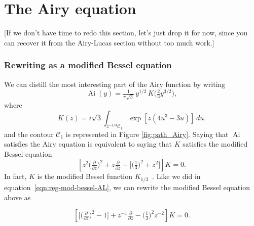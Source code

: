 \documentclass{article}
\DeclareMathOperator{\Ai}{Ai}
\theoremstyle{definition}
\theoremstyle{plain}
\newenvironment{todo}{\color{Coral}}{\color{black}}
\newenvironment{old}{\color{RoyalBlue}}{\color{black}}
\begin{document}
\section{The Airy equation}\label{airy-appendix}
%
\begin{todo}[If we don't have time to redo this section, let's just drop it for now, since you can recover it from the Airy-Lucas section without too much work.]\end{todo}
\begin{old}
\subsubsection{Rewriting as a modified Bessel equation}
We can distill the most interesting part of the Airy function by writing
\[ \Ai(y) = \tfrac{1}{\pi\sqrt{3}}\,y^{1/2}\,K\big(\tfrac{2}{3} y^{3/2}\big), \]
where
\begin{equation}\label{integral:mod-bessel}
K(z) = i\sqrt{3} \int_{z^{-1/3}\mathcal{C}_1} \exp\left[z \left(4u^3 - 3u\right)\right]\,du.
\end{equation}
and the contour $\mathcal{C}_1$ is represented in Figure \ref{fig:path_Airy}.
Saying that $\Ai$ satisfies the Airy equation is equivalent to saying that $K$ satisfies the modified Bessel equation
\begin{equation}\label{eqn:mod-bessel-1/3}
\left[z^2 \big(\tfrac{\partial}{\partial z}\big)^2 + z \tfrac{\partial}{\partial z} - \big[\big(\tfrac{1}{3}\big)^2 + z^2\big]\right] K = 0.
\end{equation}
In fact, $K$ is the modified Bessel function $K_{1/3}$~\cite[equation~9.6.1]{dlmf}.
Like we did in equation~\eqref{eqn:reg-mod-bessel-AL}, we can rewrite the modified Bessel equation above as 

\begin{equation}\label{eqn:reg-mod-bessel}
\left[ \big[ \big(\tfrac{\partial}{\partial z}\big)^2 - 1 \big] + z^{-1} \tfrac{\partial}{\partial z} - \big(\tfrac{1}{3}\big)^2 z^{-2} \right] K = 0.
\end{equation}
%

\end{old}
\end{document}
